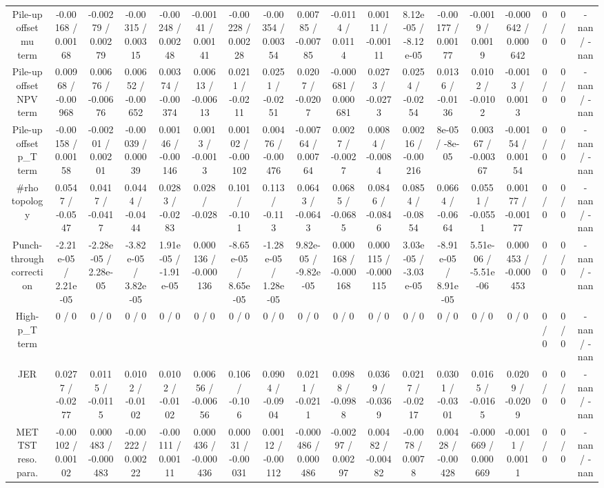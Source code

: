\documentclass[10pt]{article}
\begin{document}
\begin{table}[htbp]
\begin{center}
\begin{tabular}{|c|c|c|c|c|c|c|c|c|c|c|c|c|c|c|c|c|c|}
  Pile-up offset mu term & -0.00168 / 0.00168 & -0.00279 / 0.00279 & -0.00315 / 0.00315 & -0.00248 / 0.00248 & -0.00141 / 0.00141 & -0.00228 / 0.00228 & -0.00354 / 0.00354 & 0.00785 / -0.00785 & -0.0114 / 0.0114 & 0.00111 / -0.00111 & 8.12e-05 / -8.12e-05 & -0.00177 / 0.00177 & -0.0019 / 0.0019 & -0.000642 / 0.000642 & 0 / 0 & 0 / 0 & -nan / -nan \\ 
  Pile-up offset NPV term & 0.00968 / -0.00968 & 0.00676 / -0.00676 & 0.00652 / -0.00652 & 0.00374 / -0.00374 & 0.00613 / -0.00613 & 0.0211 / -0.0211 & 0.0251 / -0.0251 & 0.0207 / -0.0207 & -0.000681 / 0.000681 & 0.0273 / -0.0273 & 0.0254 / -0.0254 & 0.0136 / -0.0136 & 0.0102 / -0.0102 & -0.0013 / 0.0013 & 0 / 0 & 0 / 0 & -nan / -nan \\ 
  Pile-up offset p_{T} term & -0.00158 / 0.00158 & -0.00201 / 0.00201 & -0.00039 / 0.00039 & 0.00146 / -0.00146 & 0.0013 / -0.0013 & 0.00102 / -0.00102 & 0.00476 / -0.00476 & -0.00764 / 0.00764 & 0.0027 / -0.0027 & 0.0084 / -0.0084 & 0.00216 / -0.00216 & 8e-05 / -8e-05 & 0.00367 / -0.00367 & -0.00154 / 0.00154 & 0 / 0 & 0 / 0 & -nan / -nan \\ 
  #rho topology & 0.0547 / -0.0547 & 0.0417 / -0.0417 & 0.0444 / -0.0444 & 0.0283 / -0.0283 & 0.028 / -0.028 & 0.101 / -0.101 & 0.113 / -0.113 & 0.0643 / -0.0643 & 0.0685 / -0.0685 & 0.0846 / -0.0846 & 0.0854 / -0.0854 & 0.0664 / -0.0664 & 0.0551 / -0.0551 & 0.00177 / -0.00177 & 0 / 0 & 0 / 0 & -nan / -nan \\ 
  Punch-through correction & -2.21e-05 / 2.21e-05 & -2.28e-05 / 2.28e-05 & -3.82e-05 / 3.82e-05 & 1.91e-05 / -1.91e-05 & 0.000136 / -0.000136 & -8.65e-05 / 8.65e-05 & -1.28e-05 / 1.28e-05 & 9.82e-05 / -9.82e-05 & 0.000168 / -0.000168 & 0.000115 / -0.000115 & 3.03e-05 / -3.03e-05 & -8.91e-05 / 8.91e-05 & 5.51e-06 / -5.51e-06 & 0.000453 / -0.000453 & 0 / 0 & 0 / 0 & -nan / -nan \\ 
  High-p_{T} term & 0 / 0 & 0 / 0 & 0 / 0 & 0 / 0 & 0 / 0 & 0 / 0 & 0 / 0 & 0 / 0 & 0 / 0 & 0 / 0 & 0 / 0 & 0 / 0 & 0 / 0 & 0 / 0 & 0 / 0 & 0 / 0 & -nan / -nan \\ 
  JER & 0.0277 / -0.0277 & 0.0115 / -0.0115 & 0.0102 / -0.0102 & 0.0102 / -0.0102 & 0.00656 / -0.00656 & 0.106 / -0.106 & 0.0904 / -0.0904 & 0.0211 / -0.0211 & 0.0988 / -0.0988 & 0.0369 / -0.0369 & 0.0217 / -0.0217 & 0.0301 / -0.0301 & 0.0165 / -0.0165 & 0.0209 / -0.0209 & 0 / 0 & 0 / 0 & -nan / -nan \\ 
  MET TST reso. para. & -0.00102 / 0.00102 & 0.000483 / -0.000483 & -0.00222 / 0.00222 & -0.00111 / 0.00111 & 0.000436 / -0.000436 & 0.00031 / -0.00031 & 0.00112 / -0.00112 & -0.000486 / 0.000486 & -0.00297 / 0.00297 & 0.00482 / -0.00482 & -0.0078 / 0.0078 & 0.00428 / -0.00428 & -0.000669 / 0.000669 & -0.0011 / 0.0011 & 0 / 0 & 0 / 0 & -nan / -nan \\ 

\end{tabular}
\end{center}
\end{table}
\end{document}
